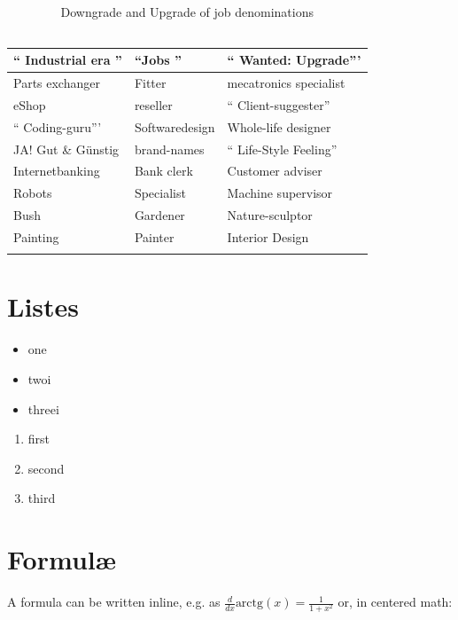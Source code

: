 \begin{table}[H]
\small
\centering
\begin{tabular}{p{5cm}|l|p{3cm}}
`` Industrial era '' &  ``Jobs '' & `` Wanted: Upgrade''' \\ \hline
Parts exchanger & Fitter & mecatronics specialist \\
eShop & reseller & `` Client-suggester'' \\
`` Coding-guru''' & Softwaredesign & Whole-life designer \\
JA! Gut \& Günstig & brand-names & `` Life-Style Feeling'' \\
Internetbanking & Bank clerk & Customer adviser \\
Robots & Specialist & Machine supervisor \\
Bush & Gardener & Nature-sculptor \\
Painting & Painter & Interior Design \\
 &  & \\
\end{tabular}
\caption[Downgrade and upgrade of job denominations]{Downgrade and Upgrade of job denominations \\ \ \ \ \cite{DueckKo:2016}}
\label{tab:Downgrade and Upgrade of job denominations}
\end{table} 

\section{Listes}

\begin{itemize}
 \itemsep0pt
 \item one
 \item twoi
 \item threei
\end{itemize}

\begin{enumerate}
 \itemsep0pt
 \item first
 \item second
 \item third
\end{enumerate}


\section{Formulæ}

A formula can be written inline, e.g. as $ \frac{d}{dx}\mbox{arctg}(x) = \frac{1}{1+x^2}$ or, in centered math:

